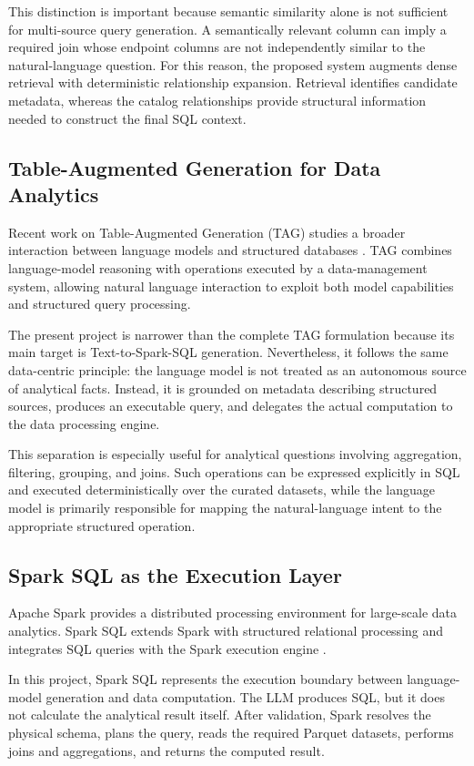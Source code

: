 This distinction is important because semantic similarity alone is not
sufficient for multi-source query generation. A semantically relevant
column can imply a required join whose endpoint columns are not
independently similar to the natural-language question. For this reason,
the proposed system augments dense retrieval with deterministic
relationship expansion. Retrieval identifies candidate metadata,
whereas the catalog relationships provide structural information needed
to construct the final SQL context.


\subsection{Table-Augmented Generation for Data Analytics}

Recent work on Table-Augmented Generation (TAG) studies a broader
interaction between language models and structured databases
\cite{biswal2024tag}. TAG combines language-model reasoning with
operations executed by a data-management system, allowing natural
language interaction to exploit both model capabilities and structured
query processing.

The present project is narrower than the complete TAG formulation
because its main target is Text-to-Spark-SQL generation. Nevertheless,
it follows the same data-centric principle: the language model is not
treated as an autonomous source of analytical facts. Instead, it is
grounded on metadata describing structured sources, produces an
executable query, and delegates the actual computation to the data
processing engine.

This separation is especially useful for analytical questions involving
aggregation, filtering, grouping, and joins. Such operations can be
expressed explicitly in SQL and executed deterministically over the
curated datasets, while the language model is primarily responsible for
mapping the natural-language intent to the appropriate structured
operation.


\subsection{Spark SQL as the Execution Layer}

Apache Spark provides a distributed processing environment for
large-scale data analytics. Spark SQL extends Spark with structured
relational processing and integrates SQL queries with the Spark
execution engine \cite{armbrust2015sparksql}.

In this project, Spark SQL represents the execution boundary between
language-model generation and data computation. The LLM produces SQL,
but it does not calculate the analytical result itself. After
validation, Spark resolves the physical schema, plans the query, reads
the required Parquet datasets, performs joins and aggregations, and
returns the computed result.

